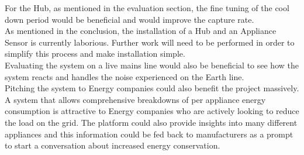 \documentclass[draft,preprint,12pt,3p]{elsarticle}
\begin{document}
For the Hub, as mentioned in the evaluation section, the fine tuning of the cool down period would be beneficial and would improve the capture rate.\\
As mentioned in the conclusion, the installation of a Hub and an Appliance Sensor is currently laborious. Further work will need to be performed in order to simplify this process and make installation simple.\\
Evaluating the system on a live mains line would also be beneficial to see how the system reacts and handles the noise experienced on the Earth line.\\
Pitching the system to Energy companies could also benefit the project massively. A system that allows comprehensive breakdowns of per appliance energy consumption is attractive to Energy companies who are actively looking to reduce the load on the grid. The platform could also provide insights into many different appliances and this information could be fed back to manufacturers as a prompt to start a conversation about increased energy conservation.\\

\clearpage

{}
\end{document}

